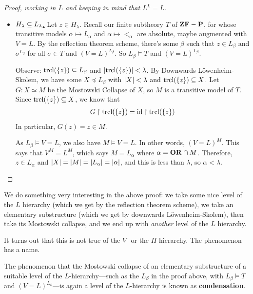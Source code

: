 \begin{proof}[Proof, working in $L$ and keeping in mind that $L^L = L$]
\begin{itemize}
        \item \underline{$H_{\lambda} \subseteq L_{\lambda}$.} Let $z \in H_{\lambda}$. Recall our finite subtheory $T$ of $\mathbf{ZF} - \mathbf{P}$, for whose transitive models $\alpha \mapsto L_{\alpha}$ and $\alpha \mapsto <_{\alpha}$ are absolute, maybe augmented with $V = L$.
        By the reflection theorem scheme, there's some $\beta$ such that $z \in L_{\beta}$ and $\sigma^{L_{\beta}}$ for all $\sigma \in T$ and $(V = L)^{L_{\beta}}$. So $L_{\beta} \models T$ and $(V = L)^{L_{\beta}}$.

        Observe: $\operatorname{trcl}\!\left( \left\{ z \right\} \right) \subseteq L_{\beta}$ and $\left\lvert \operatorname{trcl}\!\left( \left\{ z \right\} \right) \right\rvert < \lambda$. By Downwards Löwenheim-Skolem, we have some $X \preceq L_{\beta}$ with $\left\lvert X \right\rvert < \lambda$ and $\operatorname{trcl}\!\left( \left\{ z \right\} \right) \subseteq X$. Let $G : X \simeq M$ be the Mostowski Collapse of $X$, so $M$ is a transitive model of $T$. Since $\operatorname{trcl}\!\left( \left\{ z \right\} \right) \subseteq X$, we know that
        \begin{align*}
            G \restriction \operatorname{trcl}\!\left( \left\{ z \right\} \right) = \operatorname{id} \restriction \operatorname{trcl}\!\left( \left\{ z \right\} \right)
        \end{align*}
        In particular, $G(z) = z \in M$.

        As $L_{\beta} \models V = L$, we also have $M \models V = L$. In other words, $(V = L)^M$. This says that $V^M = L^M$, which says $M = L_{\alpha}$ where $\alpha = \mathbf{OR} \cap M$. Therefore, $z \in L_{\alpha}$ and $\left\lvert X \right\rvert = \left\lvert M \right\rvert = \left\lvert L_{\alpha} \right\rvert = \left\lvert \alpha \right\rvert$, and this is less than $\lambda$, so $\alpha < \lambda$.
    \end{itemize}
\end{proof}

We do something very interesting in the above proof: we take some nice level of the $L$ hierarchy (which we get by the reflection theorem scheme), we take an elementary substructure (which we get by downwards Löwenheim-Skolem), then take its Mostowski collapse, and we end up with \textit{another} level of the $L$ hierarchy.

It turns out that this is not true of the $V$- or the $H$-hierarchy. The phenomenon has a name.

\begin{boxdefinition}[Condensation]
    The phenomenon that the Mostowski collapse of an elementary substructure of a suitable level of the $L$-hierarchy---such as the $L_{\beta}$ in the proof above, with $L_{\beta} \models T$ and $(V = L)^{L_{\beta}}$---is again a level of the $L$-hierarchy is known as \textbf{condensation}.
\end{boxdefinition}


